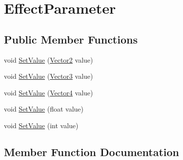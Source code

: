 \hypertarget{classMicrosoft_1_1Xna_1_1Framework_1_1Graphics_1_1EffectParameter}{}\section{Effect\+Parameter}
\label{classMicrosoft_1_1Xna_1_1Framework_1_1Graphics_1_1EffectParameter}
\subsection*{Public Member Functions}
\begin{DoxyCompactItemize}
\item 
void \hyperlink{classMicrosoft_1_1Xna_1_1Framework_1_1Graphics_1_1EffectParameter_a46d5555e000b1893191f119b035df1d7}{Set\+Value} (\hyperlink{structMicrosoft_1_1Xna_1_1Framework_1_1Vector2}{Vector2} value)
\item 
void \hyperlink{classMicrosoft_1_1Xna_1_1Framework_1_1Graphics_1_1EffectParameter_a1e92333701fda662a9666e49abed1a6b}{Set\+Value} (\hyperlink{structMicrosoft_1_1Xna_1_1Framework_1_1Vector3}{Vector3} value)
\item 
void \hyperlink{classMicrosoft_1_1Xna_1_1Framework_1_1Graphics_1_1EffectParameter_a1b4be3ce728718c58cf86a04aff4e79d}{Set\+Value} (\hyperlink{structMicrosoft_1_1Xna_1_1Framework_1_1Vector4}{Vector4} value)
\item 
void \hyperlink{classMicrosoft_1_1Xna_1_1Framework_1_1Graphics_1_1EffectParameter_a0f8f60d35b4c2a59fd8f9e9777bb33d2}{Set\+Value} (float value)
\item 
void \hyperlink{classMicrosoft_1_1Xna_1_1Framework_1_1Graphics_1_1EffectParameter_a021ad70d689e7798457030da8385ead4}{Set\+Value} (int value)
\end{DoxyCompactItemize}


\subsection{Member Function Documentation}
\hypertarget{classMicrosoft_1_1Xna_1_1Framework_1_1Graphics_1_1EffectParameter_a46d5555e000b1893191f119b035df1d7}{}
